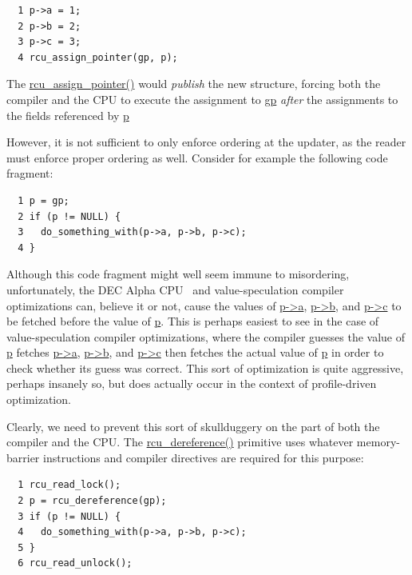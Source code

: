 \vspace{5pt}
\begin{minipage}[t]{\columnwidth}
\begin{verbatim}
  1 p->a = 1;
  2 p->b = 2;
  3 p->c = 3;
  4 rcu_assign_pointer(gp, p);
\end{verbatim}
\end{minipage}
\vspace{5pt}

The \url{rcu_assign_pointer()}
would \emph{publish} the new structure, forcing both the compiler
and the CPU to execute the assignment to \url{gp} \emph{after}
the assignments to the fields referenced by \url{p}

However, it is not sufficient to only enforce ordering at the
updater, as the reader must enforce proper ordering as well.
Consider for example the following code fragment:

\vspace{5pt}
\begin{minipage}[t]{\columnwidth}
\begin{verbatim}
  1 p = gp;
  2 if (p != NULL) {
  3   do_something_with(p->a, p->b, p->c);
  4 }
\end{verbatim}
\end{minipage}
\vspace{5pt}

Although this code fragment might well seem immune to misordering,
unfortunately, the
DEC Alpha CPU~\cite{PaulMcKenney2005i,PaulMcKenney2005j}
and value-speculation compiler optimizations can, believe it or not,
cause the values of \url{p->a}, \url{p->b}, and
\url{p->c} to be fetched before the value of \url{p}.
This is perhaps easiest to see in the case of value-speculation
compiler optimizations, where the compiler guesses the value
of \url{p} fetches \url{p->a}, \url{p->b}, and
\url{p->c} then fetches the actual value of \url{p}
in order to check whether its guess was correct.
This sort of optimization is quite aggressive, perhaps insanely so,
but does actually occur in the context of profile-driven optimization.

Clearly, we need to prevent this sort of skullduggery on the
part of both the compiler and the CPU.
The \url{rcu_dereference()} primitive uses
whatever memory-barrier instructions and compiler
directives are required for this purpose:

\vspace{5pt}
\begin{minipage}[t]{\columnwidth}
\begin{verbatim}
  1 rcu_read_lock();
  2 p = rcu_dereference(gp);
  3 if (p != NULL) {
  4   do_something_with(p->a, p->b, p->c);
  5 }
  6 rcu_read_unlock();
\end{verbatim}
\end{minipage}
\vspace{5pt}

